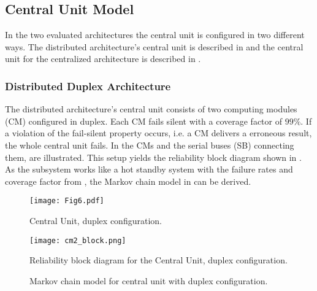 \subsection{Central Unit Model}
In the two evaluated architectures the central unit is configured in two different ways. The distributed architecture's central unit is described in  and the central unit for the centralized architecture is described in . 

\subsubsection{Distributed Duplex Architecture}
\label{subsec:dda}
The distributed architecture's central unit consists of two computing modules (CM) configured in duplex. Each CM fails silent with a coverage factor of $99\%$. If a violation of the fail-silent property occurs, i.e. a CM delivers a erroneous result, the whole central unit fails. In  the CMs and the serial buses (SB) connecting them, are illustrated. This setup yields the reliability block diagram shown in . As the subsystem works like a hot standby system with the failure rates and coverage factor from , the Markov chain model in  can be derived.

\begin{figure}[H]
  \centering
  \texttt{[image: Fig6.pdf]}
  \caption{Central Unit, duplex configuration.}
  \label{fig6}
\end{figure}
\begin{figure}[H]
  \centering
  \texttt{[image: cm2\_block.png]}
  \caption{Reliability block diagram for the Central Unit, duplex configuration.}
  \label{fig7}
\end{figure}
\begin{figure}[H]
  \begin{center}
  \caption{Markov chain model for central unit with duplex configuration.}
   \label{fig8}
\end{center}
\end{figure}



